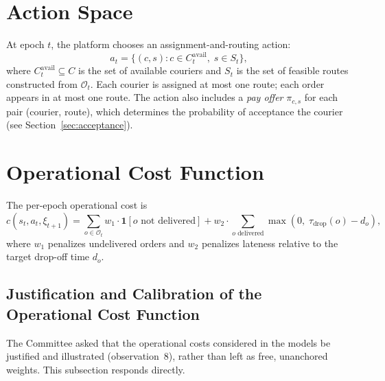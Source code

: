 \documentclass[12pt,a4paper]{report}
\begin{document}
\section{Action Space}
\label{sec:action}

At epoch $t$, the platform chooses an assignment-and-routing action:
\begin{equation}
    a_t = \{(c, s) : c \in C_t^{\text{avail}},\; s \in S_t\},
\end{equation}
where $C_t^{\text{avail}} \subseteq C$ is the set of available couriers and $S_t$ is the set of feasible routes constructed from $\mathcal{O}_t$. Each courier is assigned at most one route; each order appears in at most one route. The action also includes a \emph{pay offer} $\pi_{c,s}$ for each pair (courier, route), which determines the probability of acceptance the courier (see Section~\ref{sec:acceptance}).

\section{Operational Cost Function}
\label{sec:cost}

The per-epoch operational cost is
\begin{equation}
    c(s_t, a_t, \xi_{t+1}) = \sum_{o \in \mathcal{O}_t} w_1 \cdot \mathbf{1}[o \text{ not
    delivered}] + w_2 \cdot \sum_{o \text{ delivered}} \max(0,\; \tau_{\text{drop}}(o) - d_o),
    \label{eq:cost}
\end{equation}
where $w_1$ penalizes undelivered orders and $w_2$ penalizes lateness relative to the target drop-off time $d_o$.

\subsection{Justification and Calibration of the Operational Cost Function}
\label{sec:costjustification}

The Committee asked that the operational costs considered in the models be justified and illustrated (observation~8), rather than left as free, unanchored weights. This subsection responds directly.
\end{document}
